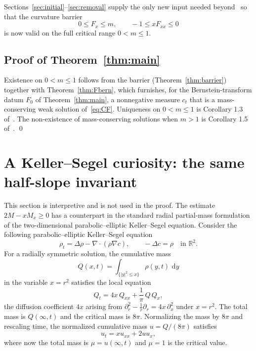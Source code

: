 \documentclass[12pt]{amsart}
\numberwithin{equation}{section}
\theoremstyle{plain}
\theoremstyle{definition}
\newcommand{\R}{\mathbb{R}}
\newcommand{\dd}{\,\mathrm{d}}
\renewcommand{\d}{\partial}
\begin{document}
Sections~\ref{sec:initial}--\ref{sec:removal} supply the only new input needed
beyond~\cite{TV} so that the curvature barrier
\[
	0\le F_x\le m,\qquad -1\le xF_{xx}\le0
\]
is now valid on the full critical range $0<m\le1$.

\subsection{Proof of Theorem~\ref{thm:main}}
Existence on $0<m\le1$ follows from the barrier (Theorem~\ref{thm:barrier})
together with Theorem~\ref{thm:Fbern}, which furnishes, for the
Bernstein-transform datum $F_0$ of Theorem~\ref{thm:main}, a nonnegative
measure $c_t$ that is a mass-conserving weak solution of~\eqref{eq:CF}.
Uniqueness on $0<m\le1$ is Corollary 1.3 of~\cite{TV}.
The non-existence of mass-conserving solutions when $m>1$ is
Corollary 1.5 of~\cite{TV}.
\qed

\section{A Keller--Segel curiosity: the same half-slope
  invariant}\label{sec:legendre}

This section is interpretive and is not used in the proof.
The estimate
$2M-xM_x\ge0$ has a counterpart in the
standard radial partial-mass formulation of the two-dimensional
parabolic--elliptic Keller--Segel equation.
Consider the following parabolic--elliptic Keller--Segel equation
\begin{equation}\label{eq:KSsystem}
	\rho_t=\Delta\rho-\nabla\cdot(\rho\nabla c),\qquad -\Delta c=\rho
	\quad\text{in }\R^2 .
\end{equation}
For a radially symmetric solution, the cumulative mass
\begin{equation}\label{eq:Qdef}
	Q(x,t)=\int_{\{|y|^2\le x\}}\rho(y,t)\,\dd y
\end{equation}
in the variable $x=r^2$ satisfies the local equation~\cite{BKLN}
\begin{equation}\label{eq:KSraw}
	Q_t=4x\,Q_{xx}+\frac1\pi\,Q\,Q_x ,
\end{equation}
the diffusion coefficient $4x$ arising from $\d_r^2-\tfrac1r\d_r=4x\,\d_x^2$
under $x=r^2$.
The total mass is $Q(\infty,t)$ and the critical mass is $8\pi$.
Normalizing the mass by $8\pi$ and rescaling time, the normalized
cumulative mass $u=Q/(8\pi)$ satisfies
\begin{equation}\label{eq:KS}
	u_t=xu_{xx}+2uu_x ,
\end{equation}
where now the total mass is $\mu=u(\infty,t)$ and $\mu=1$ is the critical
value.
\end{document}
